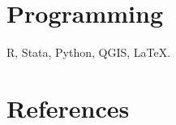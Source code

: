 \documentclass[letterpaper]{article}
\renewenvironment{itemize}{
  \begin{list}{}{
    \setlength{\leftmargin}{1.5em}
  }
}{
  \end{list}
}
\begin{document}
\section*{Programming}
\vspace{2 mm}
{\makebox[2.3cm]{\hfill}}R, Stata, Python, QGIS, \LaTeX.
\vspace{2 mm}



\section*{References}
\end{document}
